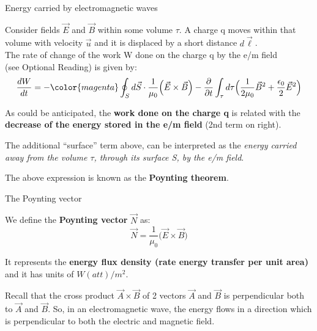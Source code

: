 %
%
%
%

\begin{frame}{Energy carried by electromagnetic waves}

Consider fields $\vec{E}$ and $\vec{B}$ within some volume $\tau$.
A charge q moves within that volume with velocity $\vec{u}$ and it is displaced by a short distance $d\vec{\ell}$.\\
\vspace{0.2cm}
The rate of change of the work W done on the charge q by the
e/m field\\ (see Optional Reading) is given by:
\begin{equation*}
  \frac{dW}{dt} =
     - {\color{magenta} \oint_{S} d\vec{S} \cdot \frac{1}{\mu_0} \Big(\vec{E} \times \vec{B} \Big) }
     - \frac{\partial}{\partial t} \int_{\tau} d\tau  \Big( \frac{1}{2\mu_0} \vec{B}^2 + \frac{\epsilon_0}{2} \vec{E}^2 \Big)
\end{equation*}

As could be anticipated, the {\bf work done on the charge q} is related with the
{\bf decrease of the energy stored in the e/m field} (2nd term on right).\\
\vspace{0.2cm}

The additional {\color{magenta}``surface'' term} above,
can be interpreted as the {\em energy carried away
from the volume $\tau$, through its surface S, by the e/m field}.\\
\vspace{0.2cm}

The above expression is known as the {\bf Poynting theorem}.


\end{frame}


%
%
%
%

\begin{frame}{The Poynting vector}

We define the {\bf Poynting vector} $\vec{N}$ as:
\begin{equation*}
  \vec{N} = \frac{1}{\mu_0} \Big( \vec{E} \times \vec{B} \Big)
\end{equation*}

\vspace{0.3cm}

It represents the {\bf energy flux density (rate energy transfer per unit area)} and it has units of $W(att)/m^2$.\\

\vspace{0.3cm}

Recall that the cross product $\vec{A} \times \vec{B}$ of 2 vectors $\vec{A}$ and $\vec{B}$
is perpendicular both to $\vec{A}$ and $\vec{B}$. So, in an electromagnetic wave, the energy
flows in a direction which is perpendicular to both the electric and magnetic field.

\end{frame}

